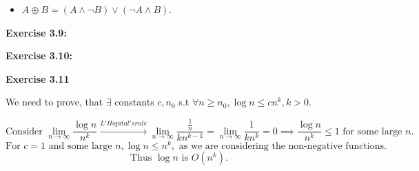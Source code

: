 \documentclass{article}
\begin{document}
\begin{framed}
\begin{itemize}
        \item $A \oplus B = (A \land \lnot B) \lor (\lnot A \land B)$.
    \end{itemize}
    
\end{framed}

\bigskip

\begin{framed}
    \noindent \textbf{Exercise 3.9: }
    
    \medskip
    
    
\end{framed}

\bigskip

\begin{framed}
    \noindent \textbf{Exercise 3.10: }
    
    \medskip
    
    
\end{framed}

\bigskip

\begin{framed}
    \noindent \textbf{Exercise 3.11}
    
    \medskip
    We need to prove, that $\exists $ constants $c,n_0$ s.t $\forall n \geq n_0, \log n \leq cn^{k}, k > 0$. 

    $$
    \text{Consider } \lim_{n \rightarrow \infty}{\frac{\log n}{n^{k}}} \xrightarrow[]{L'Hopital's rule} \lim_{n \rightarrow \infty}{\frac{\frac{1}{n}}{kn^{k-1}}} = \lim_{n \rightarrow \infty}{\frac{1}{kn^{k}}} = 0 \implies \frac{\log{n}}{n^k} \leq 1 \text{ for some large } n.
    $$
    $$
    \text{For } c = 1 \text{ and some large } n, \log{n} \leq n^{k}, \text{ as we are considering the non-negative functions}. 
    $$
    $$
    \text{Thus } \log{n} \text{ is } O(n^{k}).
    $$
    
\end{framed}

\bigskip
\end{document}
